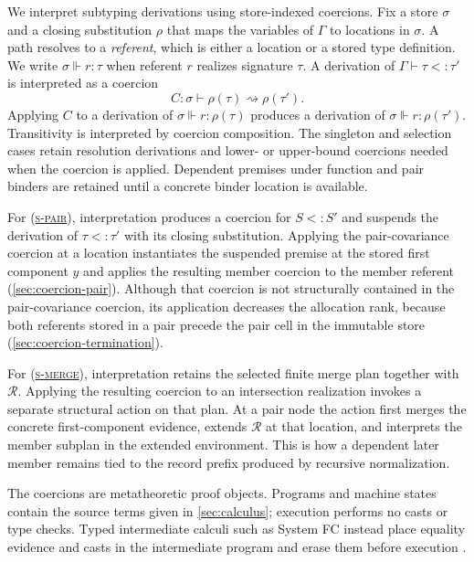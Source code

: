\documentclass[acmsmall,screen,nonacm]{acmart}
\newcommand{\ruleref}[1]{%
  \textsc{(\hyperref[rule:#1]{#1})}}
\newcommand{\realizes}{\Vdash}
\newcommand{\coerce}{\mathrel{\rightsquigarrow}}
\begin{document}
We interpret subtyping derivations using store-indexed coercions. Fix a store
\(\sigma\) and a closing substitution \(\rho\) that maps the variables of
\(\Gamma\) to locations in \(\sigma\). A path resolves to a \emph{referent},
which is either a location or a stored type definition. We write
\(\sigma\realizes r:\tau\) when referent \(r\) realizes signature \(\tau\).
A derivation of \(\Gamma\vdash\tau<:\tau'\) is interpreted as a coercion
\[
  C:\sigma\vdash\rho(\tau)\coerce\rho(\tau').
\]
Applying \(C\) to a derivation of
\(\sigma\realizes r:\rho(\tau)\) produces a derivation of
\(\sigma\realizes r:\rho(\tau')\). Transitivity is interpreted by coercion
composition. The singleton and selection cases retain resolution derivations
and lower- or upper-bound coercions needed when the coercion is applied.
Dependent
premises under function and pair binders are retained until a concrete binder
location is available.

For \ruleref{s-pair}, interpretation produces a coercion for \(S<:S'\) and
suspends the derivation of \(\tau<:\tau'\) with its closing substitution.
Applying the pair-covariance coercion at a location instantiates the suspended premise
at the stored first component \(y\) and applies the resulting member coercion
to the member referent (\cref{sec:coercion-pair}). Although that coercion is
not structurally contained in the pair-covariance coercion, its application decreases
the allocation rank, because both referents stored in a pair precede the
pair cell in the immutable store (\cref{sec:coercion-termination}).

For \ruleref{s-merge}, interpretation retains the selected finite merge plan
together with \(\mathcal R\). Applying the resulting coercion to an
intersection realization invokes a separate structural action on that plan.
At a pair node the action first merges the concrete first-component evidence,
extends \(\mathcal R\) at that location, and interprets the member subplan in
the extended environment. This is how a dependent later member remains tied
to the record prefix produced by recursive normalization.

The coercions are metatheoretic proof objects. Programs and
machine states contain the source terms given in \cref{sec:calculus};
execution performs no casts or type checks. Typed intermediate calculi such
as System FC instead place equality evidence and casts in the intermediate
program and erase them before execution \citep{sulzmann2007systemfc}.
\end{document}
